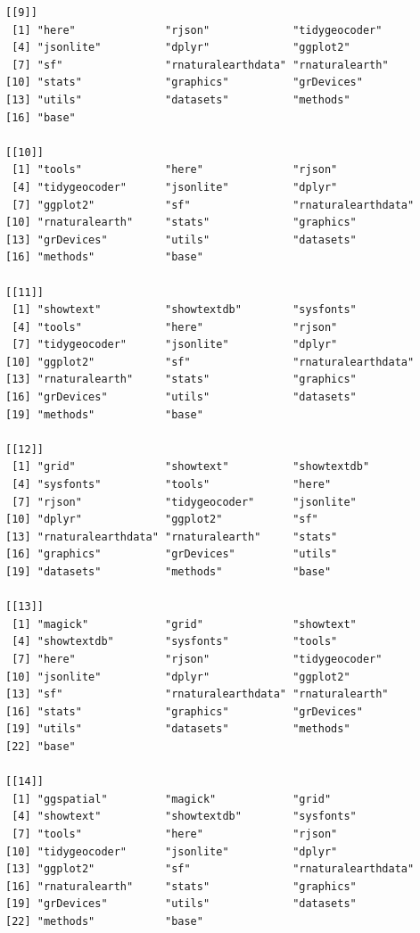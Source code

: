 \documentclass[
  letterpaper,
  DIV=11,
  numbers=noendperiod]{scrartcl}
\begin{document}
\begin{verbatim}
[[9]]
 [1] "here"              "rjson"             "tidygeocoder"     
 [4] "jsonlite"          "dplyr"             "ggplot2"          
 [7] "sf"                "rnaturalearthdata" "rnaturalearth"    
[10] "stats"             "graphics"          "grDevices"        
[13] "utils"             "datasets"          "methods"          
[16] "base"             

[[10]]
 [1] "tools"             "here"              "rjson"            
 [4] "tidygeocoder"      "jsonlite"          "dplyr"            
 [7] "ggplot2"           "sf"                "rnaturalearthdata"
[10] "rnaturalearth"     "stats"             "graphics"         
[13] "grDevices"         "utils"             "datasets"         
[16] "methods"           "base"             

[[11]]
 [1] "showtext"          "showtextdb"        "sysfonts"         
 [4] "tools"             "here"              "rjson"            
 [7] "tidygeocoder"      "jsonlite"          "dplyr"            
[10] "ggplot2"           "sf"                "rnaturalearthdata"
[13] "rnaturalearth"     "stats"             "graphics"         
[16] "grDevices"         "utils"             "datasets"         
[19] "methods"           "base"             

[[12]]
 [1] "grid"              "showtext"          "showtextdb"       
 [4] "sysfonts"          "tools"             "here"             
 [7] "rjson"             "tidygeocoder"      "jsonlite"         
[10] "dplyr"             "ggplot2"           "sf"               
[13] "rnaturalearthdata" "rnaturalearth"     "stats"            
[16] "graphics"          "grDevices"         "utils"            
[19] "datasets"          "methods"           "base"             

[[13]]
 [1] "magick"            "grid"              "showtext"         
 [4] "showtextdb"        "sysfonts"          "tools"            
 [7] "here"              "rjson"             "tidygeocoder"     
[10] "jsonlite"          "dplyr"             "ggplot2"          
[13] "sf"                "rnaturalearthdata" "rnaturalearth"    
[16] "stats"             "graphics"          "grDevices"        
[19] "utils"             "datasets"          "methods"          
[22] "base"             

[[14]]
 [1] "ggspatial"         "magick"            "grid"             
 [4] "showtext"          "showtextdb"        "sysfonts"         
 [7] "tools"             "here"              "rjson"            
[10] "tidygeocoder"      "jsonlite"          "dplyr"            
[13] "ggplot2"           "sf"                "rnaturalearthdata"
[16] "rnaturalearth"     "stats"             "graphics"         
[19] "grDevices"         "utils"             "datasets"         
[22] "methods"           "base"             


\end{verbatim}
\end{document}
